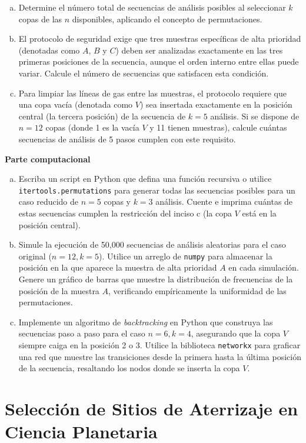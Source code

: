 \documentclass[a4paper]{article}
\begin{document}
\begin{enumerate}[a)]
\item Determine el número total de secuencias de análisis posibles al seleccionar $k$ copas de las $n$ disponibles, aplicando el concepto de permutaciones.
\item El protocolo de seguridad exige que tres muestras específicas de alta prioridad (denotadas como $A$, $B$ y $C$) deben ser analizadas exactamente en las tres primeras posiciones de la secuencia, aunque el orden interno entre ellas puede variar. Calcule el número de secuencias que satisfacen esta condición.
\item Para limpiar las líneas de gas entre las muestras, el protocolo requiere que una copa vacía (denotada como $V$) sea insertada exactamente en la posición central (la tercera posición) de la secuencia de $k = 5$ análisis. Si se dispone de $n = 12$ copas (donde 1 es la vacía $V$ y 11 tienen muestras), calcule cuántas secuencias de análisis de 5 pasos cumplen con este requisito.
\end{enumerate}

\textbf{Parte computacional}
\begin{enumerate}[a)]
\item Escriba un script en Python que defina una función recursiva o utilice \texttt{itertools.permutations} para generar todas las secuencias posibles para un caso reducido de $n = 5$ copas y $k = 3$ análisis. Cuente e imprima cuántas de estas secuencias cumplen la restricción del inciso c (la copa $V$ está en la posición central).
\item Simule la ejecución de 50,000 secuencias de análisis aleatorias para el caso original ($n = 12, k = 5$). Utilice un arreglo de \texttt{numpy} para almacenar la posición en la que aparece la muestra de alta prioridad $A$ en cada simulación. Genere un gráfico de barras que muestre la distribución de frecuencias de la posición de la muestra $A$, verificando empíricamente la uniformidad de las permutaciones.
\item Implemente un algoritmo de \textit{backtracking} en Python que construya las secuencias paso a paso para el caso $n = 6, k = 4$, asegurando que la copa $V$ siempre caiga en la posición 2 o 3. Utilice la biblioteca \texttt{networkx} para graficar una red que muestre las transiciones desde la primera hasta la última posición de la secuencia, resaltando los nodos donde se inserta la copa $V$.
\end{enumerate}

\section{Selección de Sitios de Aterrizaje en Ciencia Planetaria}
\label{sec:problema-29}
\end{document}
